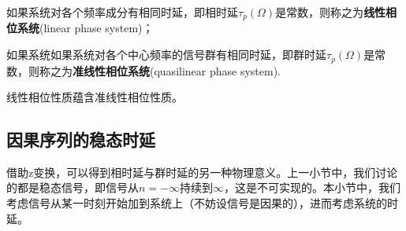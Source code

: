 \begin{definition}[离散线性相位系统]
    如果系统对各个频率成分有相同时延，即相时延$\tau_p(\Omega)$是常数，则称之为\textbf{线性相位系统}(linear phase system)；

    如果系统如果系统对各个中心频率的信号群有相同时延，即群时延$\tau_p(\Omega)$是常数，则称之为\textbf{准线性相位系统}(quasilinear phase system).

    线性相位性质蕴含准线性相位性质。
\end{definition}

\subsection{因果序列的稳态时延}\label{sub:causual_static_delay}

借助z变换，可以得到相时延与群时延的另一种物理意义。上一小节中，我们讨论的都是稳态信号，即信号从$n=-\infty$持续到$\infty$，这是不可实现的。本小节中，我们考虑信号从某一时刻开始加到系统上（不妨设信号是因果的），进而考虑系统的时延。

